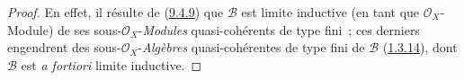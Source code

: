 \begin{proof}
En effet, il résulte de (\hyperref[I.9.4.9-fr]{9.4.9}) que $\mathscr{B}$
est limite inductive (en tant que $\mathscr{O}_X$-Module) de ses
sous-$\mathscr{O}_X$-\emph{Modules} quasi-cohérents de type fini~; ces derniers
engendrent des sous-$\mathscr{O}_X$-\emph{Algèbres} quasi-cohérentes de type fini
de $\mathscr{B}$ (\hyperref[I.1.3.14-fr]{1.3.14}), dont $\mathscr{B}$ est
\emph{a fortiori} limite inductive.
\end{proof}
